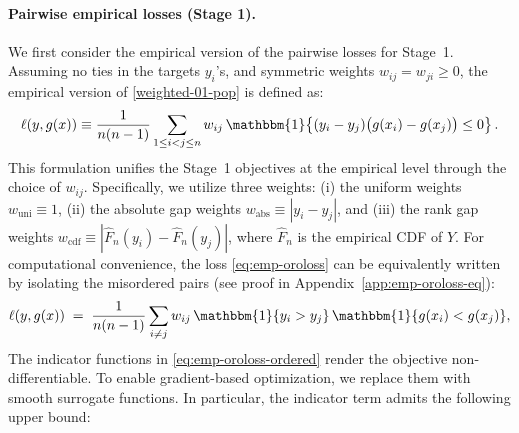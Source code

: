 \documentclass[11pt]{article}
\theoremstyle{plain}
\theoremstyle{plain}
\theoremstyle{plain}
\theoremstyle{plain}
\theoremstyle{plain}
\theoremstyle{plain}
\theoremstyle{plain}
\begin{document}
\paragraph{Pairwise empirical losses (Stage 1).} 
We first consider the empirical version of the pairwise losses for Stage~1. Assuming no ties in the targets $y_i$'s, and symmetric weights $w_{ij}=w_{ji}\ge 0$, the empirical version of \eqref{weighted-01-pop} is defined as:
\begin{equation}
\label{eq:emp-oroloss}
    \ell(y, g(x))
    \equiv
    \frac{1}{n(n-1)}\sum_{1\le i<j\le n}
    w_{ij}\,
    \mathbbm{1}\!\left\{(y_i-y_j)\big(g(x_i)-g(x_j)\big)\le 0\right\}.
\end{equation}
This formulation unifies the Stage~1 objectives at the empirical level through the choice of $w_{ij}$. Specifically, we utilize three weights: (i) the uniform weights $w_{\text{uni}} \equiv 1$, (ii) the absolute gap weights $w_{\text{abs}} \equiv |y_i - y_j|$, and (iii) the rank gap weights $w_{\text{cdf}} \equiv |\hat{F}_n(y_i) - \hat{F}_n(y_j)|$, where $\hat{F}_n$ is the empirical CDF of $Y$. For computational convenience, the loss \eqref{eq:emp-oroloss} can be equivalently written by isolating the misordered pairs (see proof in Appendix~\ref{app:emp-oroloss-eq}):
\begin{equation}
\label{eq:emp-oroloss-ordered}
    \ell(y, g(x))
    \;=\;
    \frac{1}{n(n-1)}\sum_{i\ne j}
    w_{ij}\,
    \mathbbm{1}\{y_i>y_j\}\,\mathbbm{1}\{g(x_i)<g(x_j)\},
\end{equation}
The indicator functions in \eqref{eq:emp-oroloss-ordered} render the objective non-differentiable. To enable gradient-based optimization, we replace them with smooth surrogate functions. In particular, the indicator term admits the following upper bound:
\end{document}
